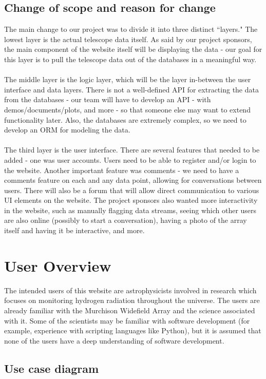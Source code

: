 \documentclass[12pt]{article}
\begin{document}
\begin{spacing}{1.5}
\subsection{Change of scope and reason for change}
The main change to our project was to divide it into three distinct ``layers." 
The lowest layer is the actual telescope data itself. As said by our project sponsors, the main component of the website itself will be displaying the data - our goal for this layer is to pull the telescope data out of the databases in a meaningful way.
\\ \\
The middle layer is the logic layer, which will be the layer in-between the user interface and data layers. There is not a well-defined API for extracting the data from the databases - our team will have to develop an API - with demos/documents/plots, and more - so that someone else may want to extend functionality later. Also, the databases are extremely complex, so we need to develop an ORM for modeling the data. 
\\ \\
The third layer is the user interface. There are several features that needed to be added - one was user accounts. Users need to be able to register and/or login to the website. Another important feature was comments - we need to have a comments feature on each and any data point, allowing for conversations between users. There will also be a forum that will allow direct communication to various UI elements on the website. The project sponsors also wanted more interactivity in the website, such as manually flagging data streams, seeing which other users are also online (possibly to start a conversation), having a photo of the array itself and having it be interactive, and more. 

\section{User Overview}
The intended users of this website are astrophysicists involved in research which focuses on monitoring hydrogen radiation throughout the universe. The users are already familiar with the Murchison Widefield Array and the science associated with it. Some of the scientists may be familiar with software development (for example, experience with scripting languages like Python), but it is assumed that none of the users have a deep understanding of software development.

\subsection{Use case diagram}

\end{spacing}
\end{document}
